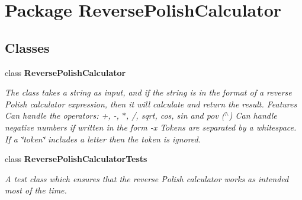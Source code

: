 \section{Package Reverse\+Polish\+Calculator}
\label{namespace_reverse_polish_calculator}
\subsection*{Classes}
\begin{DoxyCompactItemize}
\item 
class {\bf Reverse\+Polish\+Calculator}
\begin{DoxyCompactList}\small\item\em The class takes a string as input, and if the string is in the format of a reverse Polish calculator expression, then it will calculate and return the result. Features Can handle the operators\+: +, -\/, $\ast$, /, sqrt, cos, sin and pov ($^\wedge$) Can handle negative numbers if written in the form -\/x Tokens are separated by a whitespace. If a \char`\"{}token\char`\"{} includes a letter then the token is ignored. \end{DoxyCompactList}\item 
class {\bf Reverse\+Polish\+Calculator\+Tests}
\begin{DoxyCompactList}\small\item\em A test class which ensures that the reverse Polish calculator works as intended most of the time. \end{DoxyCompactList}\end{DoxyCompactItemize}
